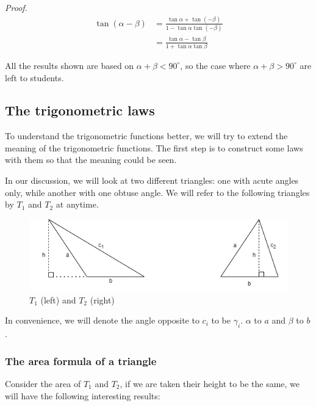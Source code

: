 \documentclass[12pt]{article}
\renewenvironment{proof}[1][Proof]{\begin{snugshade*} \textit{{#1}.}\\}{\hfill \qedsymbol \end{snugshade*}}
\begin{document}
    \begin{proof}
        \begin{align*}
            \tan(\alpha-\beta)&=\frac{\tan{\alpha}+\tan(-\beta)}{1-\tan{\alpha}\tan(-\beta)}\\
            &=\frac{\tan{\alpha}-\tan{\beta}}{1+\tan{\alpha}\tan{\beta}}
        \end{align*}
    \end{proof}

    All the results shown are based on $\alpha+\beta<90^\circ$, so the case where $\alpha+\beta>90^\circ$ are left to students.

    \subsection{The trigonometric laws}

    To understand the trigonometric functions better, we will try to extend the meaning of the trigonometric functions. The first step is to construct some laws with them so that the meaning could be seen.

    In our discussion, we will look at two different triangles: one with acute angles only, while another with one obtuse angle. We will refer to the following triangles by $T_1$ and $T_2$ at anytime.

    \begin{figure}[H]
        \centering
        \includegraphics[scale=0.8]{triangles.png}
        \caption{$T_1$ (left) and $T_2$ (right)}
    \end{figure}

    In convenience, we will denote the angle opposite to $c_i$ to be $\gamma_i$. $\alpha$ to $a$ and $\beta$ to $b$.

    \subsubsection*{The area formula of a triangle}

    Consider the area of $T_1$ and $T_2$, if we are taken their height to be the same, we will have the following interesting results:
\end{document}
